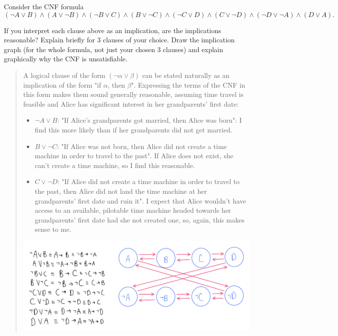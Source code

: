 \documentclass[11pt]{article}
\begin{document}
\begin{enumerate}
Consider the CNF formula
$$(\neg A \vee B)\wedge (A \vee \neg B)\wedge (\neg B \vee C)\wedge (B \vee \neg C) \wedge (\neg C \vee D)\wedge ( C \vee \neg D) \wedge (\neg D \vee \neg A)\wedge (D \vee A).$$

If you interpret each clause above as an implication, are the implications reasonable? Explain briefly for 3 clauses of your choice. Draw the implication graph (for the whole formula, not just your chosen 3 clauses) and explain graphically why the CNF is unsatisfiable. 

\begin{quote}
    \color{purple}
    A logical clause of the form $(\neg \alpha \lor \beta)$ can be stated naturally as an implication of the form "if $\alpha$, then $\beta$". Expressing the terms of the CNF in this form makes them sound generally reasonable, assuming time travel is feasible and Alice has significant interest in her grandparents' first date: \\
    \begin{itemize}
        \item $\neg A \lor B$: "If Alice's grandparents got married, then Alice was born": I find this more likely than if her grandparents did not get married. 
        \item $B \lor \neg C$: "If Alice was not born, then Alice did not create a time machine in order to travel to the past". If Alice does not exist, she can't create a time machine, so I find this reasonable.
        \item $C \lor \neg D$: "If Alice did not create a time machine in order to travel to the past, then Alice did not land the time machine at her grandparents' first date and ruin it". I expect that Alice wouldn't have access to an available, pilotable time machine headed towards her grandparents' first date had she not created one, so, again, this makes sense to me.
    \end{itemize}

    \hspace{-7em}
    \includegraphics[scale=0.4]{implication_graph.png} \\


\end{quote}
\end{enumerate}
\end{document}
